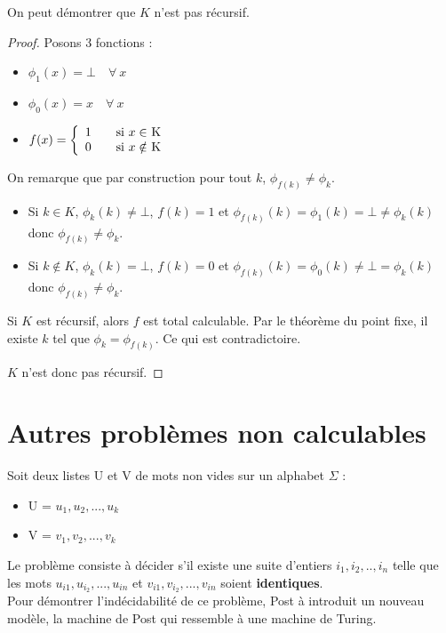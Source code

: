 \begin{myrem}
	On peut démontrer que $K$ n'est pas récursif.

    \begin{proof}
	Posons 3 fonctions :
	\begin{itemize}
		\item $\phi_1(x) = \bot \quad \forall \ x$
		\item $\phi_0(x) = x \quad \forall  \ x$
		\item $ f(x) = \left\{
		\begin{array}{l l}
			1 & \quad \text{si $x\in$ K}\\
    		0 & \quad \text{si $x\notin$ K}
		\end{array} \right.$
	\end{itemize}
    On remarque que par construction pour tout $k$, $\phi_{f(k)} \neq \phi_k$.
    \begin{itemize}
      \item Si $k \in K$, $\phi_k(k) \neq \bot$, $f(k) = 1$ et
        $\phi_{f(k)}(k) = \phi_1(k) = \bot \neq \phi_k(k)$ donc $\phi_{f(k)} \neq \phi_k$.
      \item Si $k \notin K$, $\phi_k(k) = \bot$, $f(k) = 0$ et
        $\phi_{f(k)}(k) = \phi_0(k) \neq \bot = \phi_k(k)$ donc $\phi_{f(k)} \neq \phi_k$.
    \end{itemize}
    Si $K$ est récursif, alors $f$ est total calculable.
	Par le théorème du point fixe, il existe $k$ tel que $\phi_k = \phi_{f(k)}$.
    Ce qui est contradictoire.

    $K$ n'est donc pas récursif.
  \end{proof}
\end{myrem}

\section{Autres problèmes non calculables}
\label{sub:autres_probl_mes_non_calculable}

\begin{mydef} Soit deux listes U et V
	de mots non vides sur un alphabet $\Sigma$ :
	\begin{itemize}
		\item U = ${u_1,u_2,...,u_k}$
		\item V = ${v_1,v_2,...,v_k}$
	\end{itemize}
	Le problème consiste à décider s’il existe une suite d'entiers
	$i_1,i_2,..,i_n$ telle que les mots $u_{i1},u_{i_2},...,u_{in}$ et
	$v_{i1},v_{i_2},...,v_{in}$ soient \textbf{identiques}. \\
	Pour démontrer l'indécidabilité de ce problème, Post à introduit un
	nouveau modèle, la machine de Post qui ressemble à une machine de Turing.
\end{mydef}

